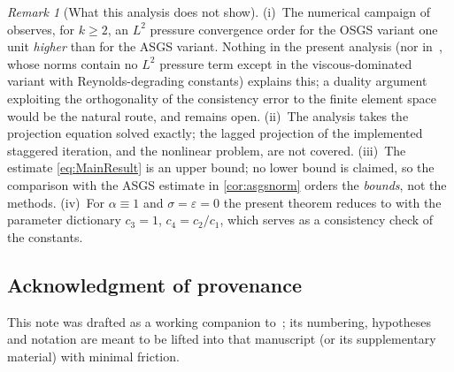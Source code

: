 \documentclass[11pt]{article}
\theoremstyle{remark}
\newtheorem{remark}[theorem]{Remark}
\begin{document}
\begin{remark}[What this analysis does not show]
\label{rem:open}
(i)~The numerical campaign of~\cite{companion} observes, for $k \ge 2$, an $L^2$
pressure convergence order for the OSGS variant one unit \emph{higher} than for the
ASGS variant. Nothing in the present analysis (nor in~\cite{Codina2008}, whose norms
contain no $L^2$ pressure term except in the viscous-dominated variant with
Reynolds-degrading constants) explains this; a duality argument exploiting the
orthogonality of the consistency error to the finite element space would be the
natural route, and remains open. (ii)~The analysis takes the projection equation
solved exactly; the lagged projection of the implemented staggered iteration, and the
nonlinear problem, are not covered. (iii)~The estimate \cref{eq:MainResult} is an
upper bound; no lower bound is claimed, so the comparison with the ASGS estimate in
\cref{cor:asgsnorm} orders the \emph{bounds}, not the methods. (iv)~For $\alpha \equiv 1$
and $\sigma = \varepsilon = 0$ the present theorem reduces to
\cite[Theorem~2]{Codina2008} with the parameter dictionary $c_3 = 1$,
$c_4 = c_2/c_1$, which serves as a consistency check of the constants.
\end{remark}

\subsection*{Acknowledgment of provenance}
This note was drafted as a working companion to~\cite{companion}; its numbering,
hypotheses and notation are meant to be lifted into that manuscript (or its
supplementary material) with minimal friction.
\end{document}
